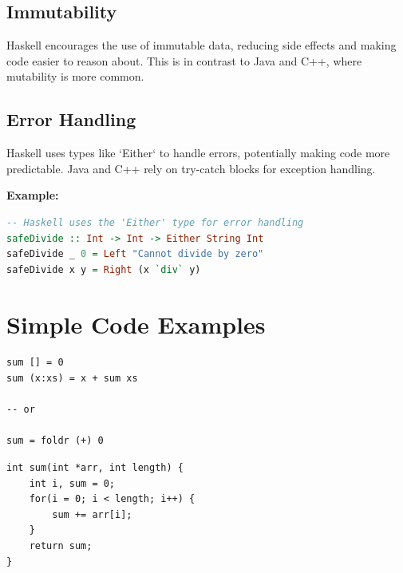 \documentclass[a4paper, 10pt]{article}
\begin{document}
        \subsection{Immutability}
        Haskell encourages the use of immutable data, reducing side effects and making code easier to reason about. This is in contrast to Java and C++, where mutability is more common.

        \subsection{Error Handling}
        Haskell uses types like `Either` to handle errors, potentially making code more predictable. Java and C++ rely on try-catch blocks for exception handling.

        \textbf{Example:}
        \begin{lstlisting}[language=Haskell]
-- Haskell uses the 'Either' type for error handling
safeDivide :: Int -> Int -> Either String Int
safeDivide _ 0 = Left "Cannot divide by zero"
safeDivide x y = Right (x `div` y)
        \end{lstlisting}
        \newpage

	\section{Simple Code Examples}
        \begin{minipage}[t]{0.45\textwidth}
            \lstset{language=Haskell}
            \begin{lstlisting}
sum [] = 0
sum (x:xs) = x + sum xs

-- or

sum = foldr (+) 0
            \end{lstlisting}
        \end{minipage}
        \hfill
        \begin{minipage}[t]{0.45\textwidth}
            \centering
            \lstset{language=C++}
            \begin{lstlisting}
int sum(int *arr, int length) {
    int i, sum = 0;
    for(i = 0; i < length; i++) {
        sum += arr[i];
    }
    return sum;
}
            \end{lstlisting}
        \end{minipage}
\end{document}
